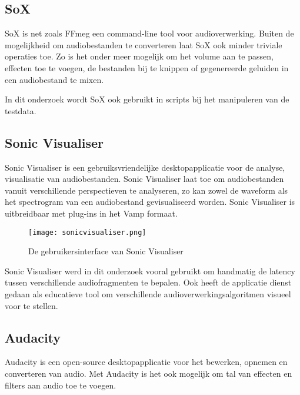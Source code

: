 \subsection{SoX}

SoX is net zoals FFmeg een command-line tool voor audioverwerking. Buiten de mogelijkheid om audiobestanden te converteren laat SoX ook minder triviale operaties toe. Zo is het onder meer mogelijk om het volume aan te passen, effecten toe te voegen, de bestanden bij te knippen of gegenereerde geluiden in een audiobestand te mixen.
\cite{barras2012sox}

In dit onderzoek wordt SoX ook gebruikt in scripts bij het manipuleren van de testdata.

\subsection{Sonic Visualiser}

Sonic Visualiser is een gebruiksvriendelijke desktopapplicatie voor de analyse, visualisatie van audiobestanden. Sonic Visualiser laat toe om audiobestanden vanuit verschillende perspectieven te analyseren, zo kan zowel de waveform als het spectrogram van een audiobestand gevisualiseerd worden. Sonic Visualiser is uitbreidbaar met plug-ins in het Vamp formaat. \cite{cannam2010sonic}

\begin{figure}[!h]
	\captionsetup{width=0.8\textwidth}
	\caption[Gebruikersinterface van Sonic Visualiser]{De gebruikersinterface van Sonic Visualiser}
	\advance\parskip0.3cm
	\centering
	\texttt{[image: sonicvisualiser.png]}
\end{figure}

Sonic Visualiser werd in dit onderzoek vooral gebruikt om handmatig de latency tussen verschillende audiofragmenten te bepalen. Ook heeft de applicatie dienst gedaan als educatieve tool om verschillende audioverwerkingsalgoritmen visueel voor te stellen.
\vspace{0.5cm}

\subsection{Audacity}

Audacity is een open-source desktopapplicatie voor het bewerken, opnemen en converteren van audio. Met Audacity is het ook mogelijk om tal van effecten en filters aan audio toe te voegen.\cite{audacity2016}

